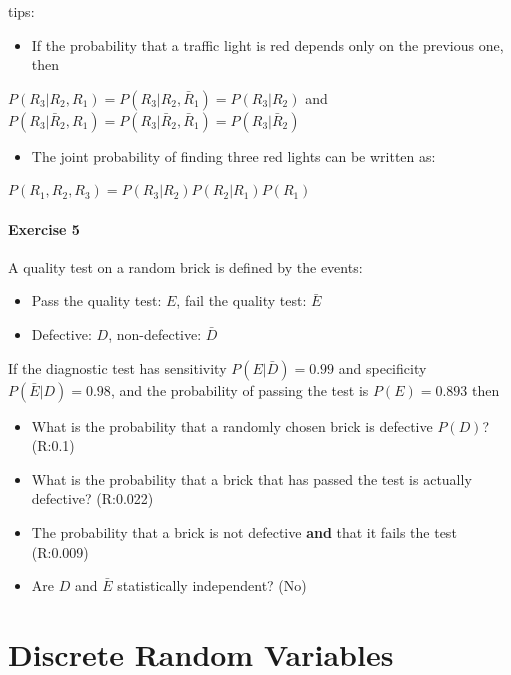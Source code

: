\documentclass[
]{book}
\providecommand{\tightlist}{%
  \setlength{\itemsep}{0pt}\setlength{\parskip}{0pt}}
\begin{document}
tips:

\begin{itemize}
\tightlist
\item
  If the probability that a traffic light is red depends only on the previous one, then
\end{itemize}

\(P(R_3|R_2,R_1)=P(R_3|R_2,\bar{R}_1)=P(R_3|R_2)\) and \(P(R_3|\bar{R}_2,R_1)=P(R_3|\bar{R}_2,\bar{R}_1)=P(R_3|\bar{R}_2)\)

\begin{itemize}
\tightlist
\item
  The joint probability of finding three red lights can be written as:
\end{itemize}

\(P(R_ 1,R _2,R_3)=P(R_3|R_2)P(R_2|R_1)P(R_1)\)

\hypertarget{exercise-5}{%
\subsubsection{Exercise 5}\label{exercise-5}}

A quality test on a random brick is defined by the events:

\begin{itemize}
\tightlist
\item
  Pass the quality test: \(E\), fail the quality test: \(\bar{E}\)
\item
  Defective: \(D\), non-defective: \(\bar{D}\)
\end{itemize}

If the diagnostic test has sensitivity \(P(E|\bar{D })= 0.99\) and specificity \(P(\bar{E}|D)=0.98\), and the probability of passing the test is \(P(E) =0.893\) then

\begin{itemize}
\item
  What is the probability that a randomly chosen brick is defective \(P(D)\)? (R:0.1)
\item
  What is the probability that a brick that has passed the test is actually defective? (R:0.022)
\item
  The probability that a brick is not defective \textbf{and} that it fails the test (R:0.009)
\item
  Are \(D\) and \(\bar{E}\) statistically independent? (No)
\end{itemize}

\hypertarget{discrete-random-variables}{%
\chapter{Discrete Random Variables}\label{discrete-random-variables}}
\end{document}
